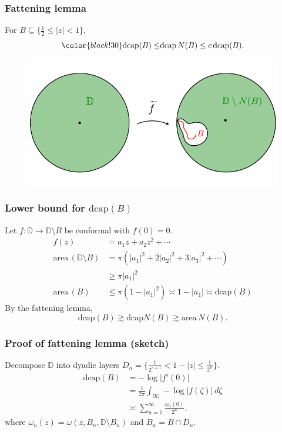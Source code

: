 \documentclass[xcolor=pdftex,dvipsnames,table]{beamer}
\newcommand{\bbD}{\mathbb{D}}
\newcommand{\go}{\omega}
\newcommand{\gz}{\zeta}
\newcommand{\area}{\text{area}\,}
\newcommand{\dcap}{\text{dcap}}
\theoremstyle{definition}
\begin{document}
\begin{frame}
  \frametitle{Fattening lemma}
  \begin{lemma}
    For $B \subseteq \{ \frac{1}{2} \leq \left| z \right| < 1 \}$,
    \[
        {\color{black!30} \dcap(B) \leq} \dcap \, N(B) \leq c \, \dcap(B).
    \]  
  \end{lemma}
  \begin{figure}
    \includegraphics[scale=0.8]{figures/fattening_04.pdf}
  \end{figure}
\end{frame}

\begin{frame}
  \frametitle{Lower bound for $\dcap(B)$}
  Let $f \colon \bbD \to \bbD \setminus B$ be conformal with $f(0) = 0$.
  \[
      \begin{aligned}
          f(z) &= a_1 z + a_2 z^2 + \cdots \\
          \area(\bbD \setminus B) &= \pi \left( \left|a_1\right|^2 + 2 \left|a_2\right|^2 + 3 \left|a_3\right|^2 + \cdots \right) \\
                                                      &\geq \pi \left| a_1\right|^2 \\
           \area(B) &\leq \pi (1 - \left|a_1\right|^2) \asymp 1 - \left| a_1 \right| \asymp \dcap(B)                                           
      \end{aligned}
  \]
  By the fattening lemma,
  \[
      \dcap (B) \gtrsim \dcap N(B) \gtrsim \area N(B).
  \]    
\end{frame}

\begin{frame}
  \frametitle{Proof of fattening lemma (sketch)}
  Decompose $\bbD$ into dyadic layers $D_n = \{ \frac{1}{2^{n+1}} < 1 - \left|z\right| \leq \frac{1}{2^n} \}$.
   \[
      \begin{aligned}
          \dcap(B) &= - \log \left| f'(0) \right| \\
          &= \frac{1}{2 \pi} \int_{\partial \bbD} - \log \left| f(\gz) \right| \, d\gz \\
          &\asymp \sum_{n=1}^{\infty} \frac{\go_n(0)}{2^n},
      \end{aligned}
  \]
  where $\go_n(z) = \go(z, B_n, \bbD \setminus B_n)$ and $B_n = B \cap D_n$.
\end{frame}
\end{document}
